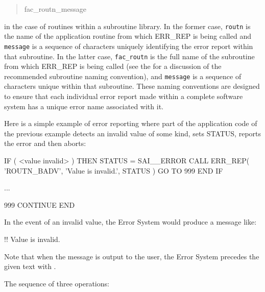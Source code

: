 \documentclass[twoside,11pt]{starlink}
\begin{document}
\begin {quote}
\begin {small}
\begin{terminalv}
fac_routn_message
\end{terminalv}
\end {small}
\end {quote}

in the case of routines within a subroutine library.
In the former case, \texttt{routn} is the name of the application routine from
which ERR\_REP is being called and \texttt{message} is a sequence of characters
uniquely identifying the error report within that subroutine.
In the latter case, \texttt{fac\_routn} is the full name of the subroutine from
which ERR\_REP is being called (see the
 for a discussion of the recommended subroutine naming
convention), and \texttt{message} is a sequence of characters unique within
that subroutine.
These naming conventions are designed to ensure that each individual error
report made within a complete software system has a unique error name
associated with it.

Here is a simple example of error reporting where part of the application
code of the previous example detects an invalid value of some kind, sets
STATUS, reports the error and then aborts:

\begin {small}
\begin{terminalv}
      IF ( <value invalid> ) THEN
         STATUS = SAI__ERROR
         CALL ERR_REP( 'ROUTN_BADV', 'Value is invalid.', STATUS )
         GO TO 999
      END IF

      ...

 999  CONTINUE
      END
\end{terminalv}
\end {small}

In the event of an invalid value, the Error System would produce a message
like:
\begin{small}
\begin{terminalv}
      !! Value is invalid.
\end{terminalv}
\end{small}
Note that when the message is output to the user, the Error System precedes
the given text with
.

The sequence of three operations:
\end{document}
